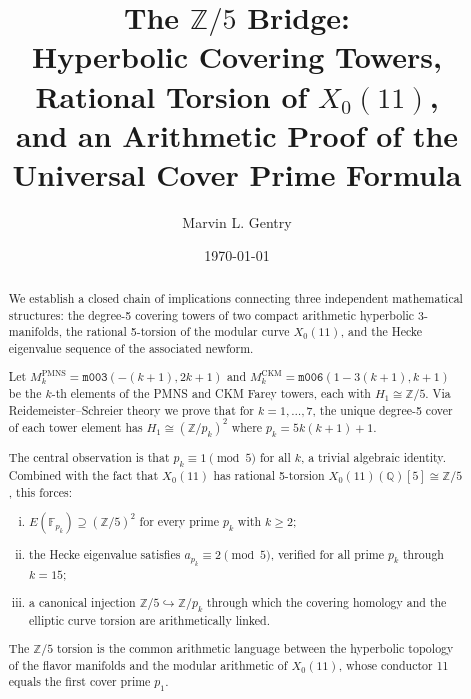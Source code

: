 \documentclass[11pt,a4paper]{article}
\theoremstyle{definition}
\newcommand{\ZZ}{\mathbb{Z}}
\newcommand{\QQ}{\mathbb{Q}}
\newcommand{\FF}{\mathbb{F}}
\newcommand{\pk}{p_k}
\newcommand{\Ek}{E(\FF_{\pk})}
\begin{document}
\title{The $\ZZ/5$ Bridge:\\
Hyperbolic Covering Towers, Rational Torsion of $X_0(11)$,\\
and an Arithmetic Proof of the Universal Cover Prime Formula}

\author{Marvin L. Gentry}
\date{\today}
\maketitle

\begin{abstract}
We establish a closed chain of implications connecting three
independent mathematical structures:
the degree-5 covering towers of two compact arithmetic hyperbolic
3-manifolds, the rational 5-torsion of the modular curve $X_0(11)$,
and the Hecke eigenvalue sequence of the associated newform.

Let $M_k^{\mathrm{PMNS}} = \texttt{m003}(-(k+1), 2k+1)$ and
$M_k^{\mathrm{CKM}} = \texttt{m006}(1-3(k+1), k+1)$ be the
$k$-th elements of the PMNS and CKM Farey towers, each with
$H_1 \cong \ZZ/5$.
Via Reidemeister--Schreier theory we prove that for $k = 1, \ldots, 7$,
the unique degree-5 cover of each tower element has
$H_1 \cong (\ZZ/\pk)^2$ where $\pk = 5k(k+1)+1$.

The central observation is that $\pk \equiv 1 \pmod{5}$
for all $k$, a trivial algebraic identity.
Combined with the fact that $X_0(11)$ has rational 5-torsion
$X_0(11)(\QQ)[5] \cong \ZZ/5$, this forces:
\begin{enumerate}[(i)]
\item $\Ek \supseteq (\ZZ/5)^2$ for every prime $\pk$ with $k \geq 2$;
\item the Hecke eigenvalue satisfies $a_{\pk} \equiv 2 \pmod{5}$,
verified for all prime $\pk$ through $k=15$;
\item a canonical injection $\ZZ/5 \hookrightarrow \ZZ/\pk$
through which the covering homology and the elliptic curve
torsion are arithmetically linked.
\end{enumerate}
The $\ZZ/5$ torsion is the common arithmetic language between the
hyperbolic topology of the flavor manifolds and the modular arithmetic
of $X_0(11)$, whose conductor 11 equals the first cover prime $p_1$.
\end{abstract}
\end{document}
